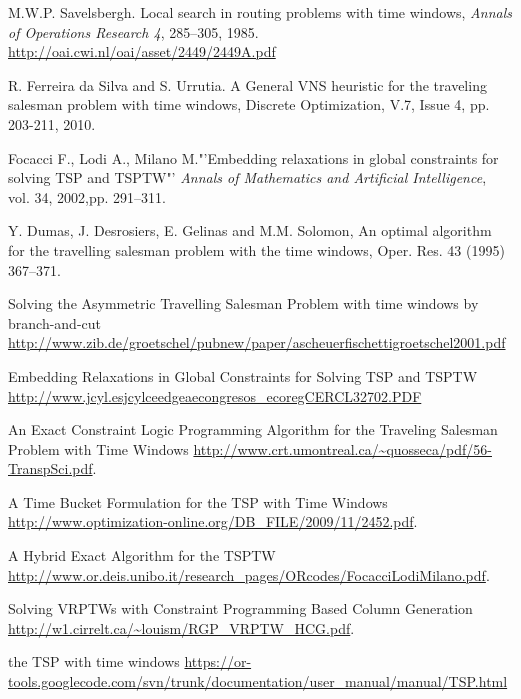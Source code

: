 \documentclass[journal, a4paper]{IEEEtran}
\begin{document}
\begin{thebibliography}{5}

M.W.P. Savelsbergh. Local search in routing problems with time windows, 
{\em Annals of Operations Research 4}, 285–305, 1985.
\url{http://oai.cwi.nl/oai/asset/2449/2449A.pdf}

R. Ferreira da Silva and S. Urrutia. A General VNS heuristic 
for the traveling salesman problem with time windows, Discrete Optimization, 
V.7, Issue 4, pp. 203-211, 2010.

Focacci F., Lodi A., Milano M."'Embedding relaxations in global constraints for solving
TSP and TSPTW"' {\em Annals of Mathematics and Artificial Intelligence},
vol. 34, 2002,pp. 291–311.

Y. Dumas, J. Desrosiers, E. Gelinas and M.M. Solomon, 
An optimal algorithm for the travelling salesman problem with the time windows,
Oper. Res. 43 (1995) 367–371.

Solving the Asymmetric Travelling Salesman Problem with time windows by branch-and-cut
\url{http://www.zib.de/groetschel/pubnew/paper/ascheuerfischettigroetschel2001.pdf}

Embedding Relaxations in Global Constraints for Solving TSP and TSPTW
\url{http://www.jcyl.esjcylceedgeaecongresos_ecoregCERCL32702.PDF}

An Exact Constraint Logic Programming Algorithm for the Traveling 
Salesman Problem with Time Windows
\url{http://www.crt.umontreal.ca/~quosseca/pdf/56-TranspSci.pdf}.

A Time Bucket Formulation for the TSP with Time Windows
\url{http://www.optimization-online.org/DB_FILE/2009/11/2452.pdf}.

A Hybrid Exact Algorithm for the TSPTW
\url{http://www.or.deis.unibo.it/research_pages/ORcodes/FocacciLodiMilano.pdf}.

Solving VRPTWs with Constraint Programming Based Column Generation
\url{http://w1.cirrelt.ca/~louism/RGP_VRPTW_HCG.pdf}.

the TSP with time windows
\url{https://or-tools.googlecode.com/svn/trunk/documentation/user_manual/manual/TSP.html}


\end{thebibliography}
\end{document}
